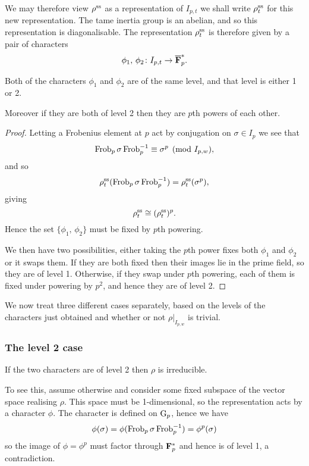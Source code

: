 \documentclass[a4paper,12pt]{article}
\begin{document}
We may therefore view $\rho^\text{ss}$ as a representation of $I_{p,t}$ we shall write $\rho^\text{ss}_t$ for this new representation.
The tame inertia group is an abelian, and so this representation is diagonalisable.
The representation $\rho^\text{ss}_t$ is therefore given by a pair of characters
\[
\phi_1,\,\phi_2\colon I_{p,t} \to \overline{\mathbf{F}}_p^*.
\]

\begin{prop}
Both of the characters $\phi_1$ and $\phi_2$ are of the same level, and that level is either 1 or 2.

Moreover if they are both of level 2 then they are $p$th powers of each other.
\end{prop}
\begin{proof}
Letting a Frobenius element at $p$ act by conjugation on $\sigma\in I_{p}$ we see that
\[
\Frob_p \sigma \Frob_p^{-1} \equiv \sigma^p \pmod{I_{p,w}}, %
\]
and so
\[
\rho^\text{ss}_t( \operatorname{Frob}_p\sigma \operatorname{Frob}_p^{-1}) = \rho^\text{ss}_t(\sigma^p),
\]
giving
\[
\rho^\text{ss}_t \cong (\rho^\text{ss}_t)^p.
\]
Hence the set $\{\phi_1,\,\phi_2\}$ must be fixed by $p$th powering.

We then have two possibilities, either taking the $p$th power fixes both $\phi_1$ and $\phi_2$ or it swaps them.
If they are both fixed then their images lie in the prime field, so they are of level 1.
Otherwise, if they swap under $p$th powering, each of them is fixed under powering by $p^2$, and hence they are of level 2.
\end{proof}

We now treat three different cases separately, based on the levels of the characters just obtained and whether or not $\rho|_{I_{p,w}}$ is trivial.


\subsubsection{The level 2 case}\label{sec:l2}
If the two characters are of level 2 then $\rho$ is irreducible.

To see this, assume otherwise and consider some fixed subspace of the vector space realising $\rho$.
This space must be 1-dimensional, so the representation acts by a character $\phi$. %
The character is defined on $\mathrm{G}_p$, hence we have
\[
\phi(\sigma) = \phi(\operatorname{Frob}_p\sigma\operatorname{Frob}_p^{-1}) = \phi^p(\sigma)
\]
so the image of $\phi = \phi^p$ must factor through $\mathbf{F}_p^*$ and hence is of level 1, a contradiction.
\end{document}
